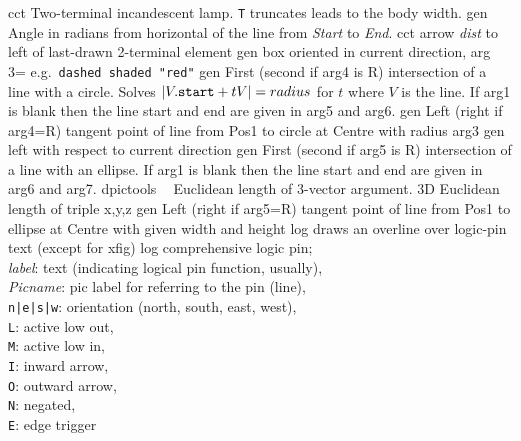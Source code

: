 %

%
  {cct}%
  {Two-terminal incandescent lamp. {\tt T} truncates leads to the body width.
   }%
%
  {gen}%
  {Angle in radians from horizontal of the line from {\sl Start}
  to {\sl End}.}%
%
  {cct}%
  {arrow {\sl dist} to left of last-drawn 2-terminal element
   }%
%
  {gen}%
  {box oriented in current direction, arg 3= e.g.\ {\tt dashed shaded "red"}}%
%
  {gen}%
  { First (second if arg4 is R) intersection of a line with a circle.
    Solves $|V.{\tt start} + tV| = {\sl radius}$ for $t$ where $V$ is the line.
    If arg1 is blank then the line start and end are given in arg5 and arg6.}%
%
  {gen}%
  { Left (right if arg4=R) tangent point of line
     from Pos1 to circle at Centre with radius arg3}%
%
  {gen}%
  {left with respect to current direction }%
%
  {gen}%
  { First (second if arg5 is R) intersection of a line with an ellipse.
    If arg1 is blank then the line start and end are given in arg6 and arg7.}%
%
  {dpictools}%
  {$\;\;$ Euclidean length of 3-vector argument.}%
%
  {3D}%
  {Euclidean length of triple x,y,z}%
%
  {gen}%
  { Left (right if arg5=R) tangent point of line
     from Pos1 to ellipse at Centre with given width and height}%
%
  {log}%
  {draws an overline over logic-pin text (except for xfig)}%
%
  {log}%
  {comprehensive logic pin;\\
   {\sl label}: text (indicating logical pin function, usually),\\
   {\sl Picname}: pic label for referring to the pin (line),\\
   {\tt n|e|s|w}: orientation (north, south, east, west),\\
   {\tt L}: active low out,\\
   {\tt M}: active low in,\\
   {\tt I}: inward arrow,\\
   {\tt O}: outward arrow,\\
   {\tt N}: negated,\\
   {\tt E}: edge trigger}%
